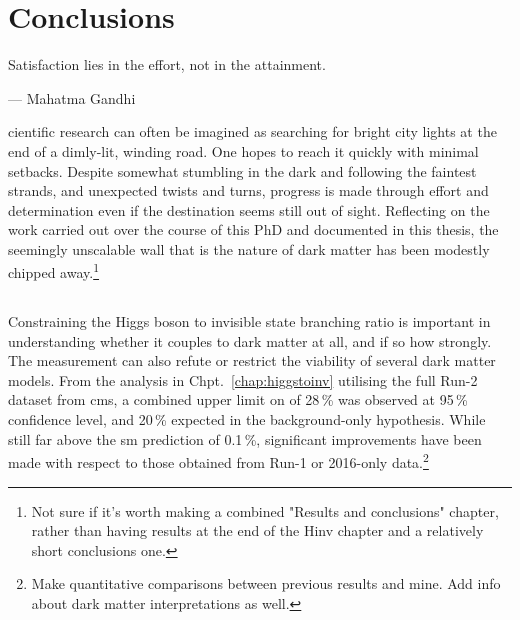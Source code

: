 \chapter{Conclusions}
\label{chap:conclusions}

\epigraph{Satisfaction lies in the effort, not in the attainment.}{--- Mahatma Gandhi}

cientific research can often be imagined as searching for bright city lights at the end of a dimly-lit, winding road. One hopes to reach it quickly with minimal setbacks. Despite somewhat stumbling in the dark and following the faintest strands, and unexpected twists and turns, progress is made through effort and determination even if the destination seems still out of sight. Reflecting on the work carried out over the course of this PhD and documented in this thesis, the seemingly unscalable wall that is the nature of dark matter has been modestly chipped away.\footnote{Not sure if it's worth making a combined "Results and conclusions" chapter, rather than having results at the end of the Hinv chapter and a relatively short conclusions one.}




\section{\texorpdfstring{\higgstoinv}{Higgs to invisible}}
\label{sec:conclusions_htoinv}

Constraining the Higgs boson to invisible state branching ratio is important in understanding whether it couples to dark matter at all, and if so how strongly. The measurement can also refute or restrict the viability of several dark matter models. From the analysis in Chpt.~\ref{chap:higgstoinv} utilising the full Run-2 dataset from \acrshort{cms}, a combined upper limit on \BRHinvFull of 28\,\% was observed at 95\,\% confidence level, and 20\,\% expected in the background-only hypothesis. While still far above the \acrlong{sm} prediction of 0.1\,\%, significant improvements have been made with respect to those obtained from Run-1 or 2016-only data.\footnote{Make quantitative comparisons between previous results and mine. Add info about dark matter interpretations as well.}

